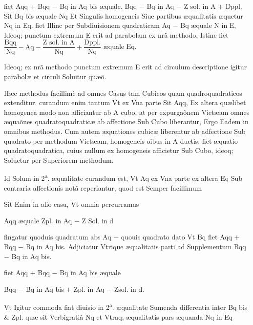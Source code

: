 \documentclass[11pt,a4paper]{article}
\begin{document}
fiet Aqq $+$ Bqq $-$ Bq in Aq bis æquale. Bqq $-$ Bq in Aq $-$ Z sol. in A $+$ Dppl. Sit Bq bis æquale Nq Et Singulis homogeneis Siue partibus æqualitatis æquetur Nq in Eq. fiet Illinc per Subdiuisionem quadraticam Aq $-$ Bq æquale N in E, Ideoq; punctum extremum E erit ad parabolam ex nrã methodo, Istinc fiet
$\dfrac{\text{Bqq}}{\text{Nq}} - \text{Aq} - \dfrac{\text{Z sol. in A}}{\text{Nq}} + \dfrac{\text{Dppl.}}{\text{Nq}}$ æquale Eq.

Ideoq; ex nrã methodo punctum extremum E erit ad circulum descriptione igitur parabolæ et circuli Soluitur quæõ.

Hæc methodus facillimè ad omnes Casus tam Cubicos quam quadroquadraticos extenditur. curandum enim tantum Vt ex Vna parte Sit Aqq, Ex altera quælibet homogenea modo non afficiantur ab A cubo. at per expurgaõnem Vietæam omnes æquaõnes quadratoquadraticæ ab affectione Sub Cubo liberantur, Ergo Eadem in omnibus methodus. Cum autem æquationes cubicæ liberentur ab adfectione Sub quadrato per methodum Vietæam, homogeneis oĩbus in A ductis, fiet æquatio quadratoquadratica, cuius nullum ex homogeneis afficietur Sub Cubo, ideoq; Soluetur per Superiorem methodum.

Id Solum in 2\textsuperscript{a}. æqualitate curandum est, Vt Aq ex Vna parte ex altera Eq Sub contraria affectionis notâ reperiantur, quod est Semper facillimum

Sit Enim in alio casu, Vt omnia percurramus

Aqq æquale Zpl. in Aq $-$ Z Sol. in d

fingatur quoduis quadratum abs Aq $-$ quouis quadrato dato Vt Bq fiet Aqq $+$ Bqq $-$ Bq in Aq bis. Adjiciatur Vtrique æqualitatis parti ad Supplementum Bqq $-$ Bq in Aq bis.

fiet Aqq $+$ Bqq $-$ Bq in Aq bis æquale

Bqq $-$ Bq in Aq bis $+$ Zpl. in Aq $-$ Zsol. in d.

Vt Igitur commoda fiat diuisio in 2\textsuperscript{a}. æqualitate Sumenda differentia inter Bq bis \& Zpl. quæ sit Verbigratiâ Nq et Vtraq; æqualitatis pars æquanda Nq in Eq
\end{document}
